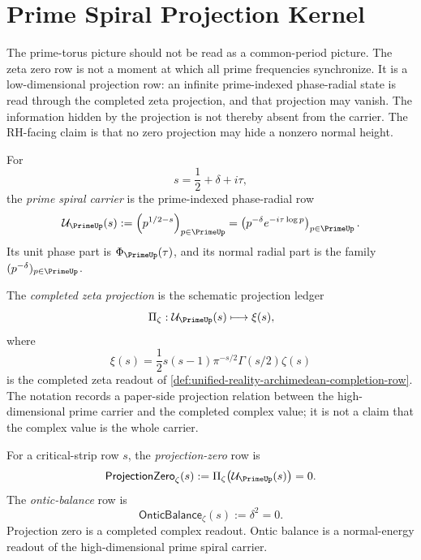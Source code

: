\section{Prime Spiral Projection Kernel}
\label{sec:unified-reality-prime-spiral-projection-kernel}

The prime-torus picture should not be read as a common-period picture.
The zeta zero row is not a moment at which all prime frequencies
synchronize.  It is a low-dimensional projection row: an infinite
prime-indexed phase-radial state is read through the completed zeta
projection, and that projection may vanish.  The information hidden by
the projection is not thereby absent from the carrier.  The RH-facing
claim is that no zero projection may hide a nonzero normal height.

\begin{definition}
\label{def:unified-reality-prime-spiral-carrier}
For
$$
s=\frac12+\delta+i\tau,
$$
the \emph{prime spiral carrier} is the prime-indexed phase-radial row
$$
\mathcal U_{\PrimeUp}(s)
:=
\left(p^{1/2-s}\right)_{p\in\PrimeUp}
=
\left(p^{-\delta}e^{-i\tau\log p}\right)_{p\in\PrimeUp}.
$$
Its unit phase part is $\Phi_{\PrimeUp}(\tau)$, and its normal radial
part is the family $(p^{-\delta})_{p\in\PrimeUp}$.
\end{definition}

\begin{definition}
\label{def:unified-reality-completed-zeta-projection}
The \emph{completed zeta projection} is the schematic projection ledger
$$
\Pi_{\zeta}:
\mathcal U_{\PrimeUp}(s)
\longmapsto
\xi(s),
$$
where
$$
\xi(s)
=
\frac12s(s-1)\pi^{-s/2}\Gamma(s/2)\zeta(s)
$$
is the completed zeta readout of
\autoref{def:unified-reality-archimedean-completion-row}.  The notation
records a paper-side projection relation between the high-dimensional
prime carrier and the completed complex value; it is not a claim that
the complex value is the whole carrier.
\end{definition}

\begin{definition}
\label{def:unified-reality-projection-zero-ontic-balance}
For a critical-strip row $s$, the \emph{projection-zero} row is
$$
\mathsf{ProjectionZero}_{\zeta}(s)
:=
\Pi_{\zeta}\bigl(\mathcal U_{\PrimeUp}(s)\bigr)=0.
$$
The \emph{ontic-balance} row is
$$
\mathsf{OnticBalance}_{\zeta}(s)
:=
\delta^2=0.
$$
Projection zero is a completed complex readout.  Ontic balance is a
normal-energy readout of the high-dimensional prime spiral carrier.
\end{definition}

